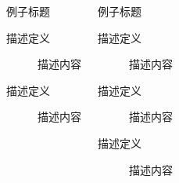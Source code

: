 \documentclass[algorithm,pgfplots]{styles/cuzbeamer}
\begin{document}
\begin{frame}
\begin{columns}[T,onlytextwidth]
\begin{exampleblock}{例子标题}
\begin{description}
                    \item[描述定义] 描述内容
                    \item[描述定义] 描述内容
                \end{description}
            \end{exampleblock}
            \begin{exampleblock}{例子标题}
                \begin{description}
                    \item[描述定义] 描述内容
                    \item[描述定义] 描述内容
                    \item[描述定义] 描述内容
                \end{description}
            \end{exampleblock}
        \end{columns}
    \end{frame}
\end{document}
